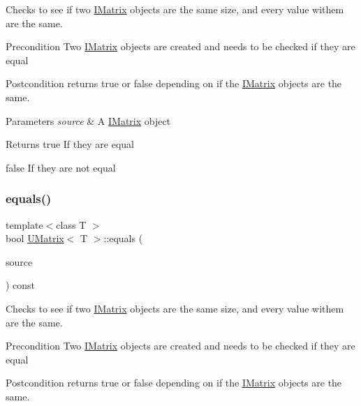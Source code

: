 Checks to see if two \mbox{\hyperlink{class_i_matrix}{I\+Matrix}} objects are the same size, and every value withem are the same. 

\begin{DoxyPrecond}{Precondition}
Two \mbox{\hyperlink{class_i_matrix}{I\+Matrix}} objects are created and needs to be checked if they are equal 
\end{DoxyPrecond}
\begin{DoxyPostcond}{Postcondition}
returns true or false depending on if the \mbox{\hyperlink{class_i_matrix}{I\+Matrix}} objects are the same.
\end{DoxyPostcond}

\begin{DoxyParams}{Parameters}
{\em source} & A \mbox{\hyperlink{class_i_matrix}{I\+Matrix}} object \\
\hline
\end{DoxyParams}
\begin{DoxyReturn}{Returns}
true If they are equal 

false If they are not equal 
\end{DoxyReturn}
\mbox{\label{class_u_matrix_a2d9385b4b327a287d76456b105d9d3b7}} 
\subsubsection{\texorpdfstring{equals()}{equals()}\hspace{0.1cm}{\footnotesize\ttfamily [4/6]}}
{\footnotesize\ttfamily template$<$class T $>$ \\
bool \mbox{\hyperlink{class_u_matrix}{U\+Matrix}}$<$ T $>$\+::equals (\begin{DoxyParamCaption}\item[{const \mbox{\hyperlink{class_i_matrix}{I\+Matrix}}$<$ \mbox{\hyperlink{class_u_matrix}{U\+Matrix}}$<$ T $>$, T $>$ \&}]{source }\end{DoxyParamCaption}) const\hspace{0.3cm}{\ttfamily [virtual]}}



Checks to see if two \mbox{\hyperlink{class_i_matrix}{I\+Matrix}} objects are the same size, and every value withem are the same. 

\begin{DoxyPrecond}{Precondition}
Two \mbox{\hyperlink{class_i_matrix}{I\+Matrix}} objects are created and needs to be checked if they are equal 
\end{DoxyPrecond}
\begin{DoxyPostcond}{Postcondition}
returns true or false depending on if the \mbox{\hyperlink{class_i_matrix}{I\+Matrix}} objects are the same.
\end{DoxyPostcond}

